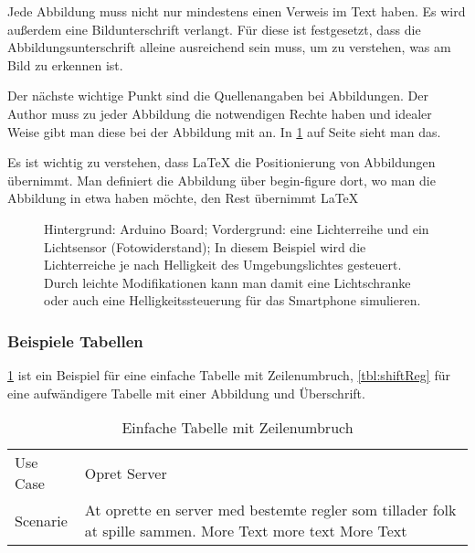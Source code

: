 Jede Abbildung muss nicht nur mindestens einen Verweis im Text haben. Es wird außerdem eine Bildunterschrift verlangt. Für diese ist festgesetzt, dass die Abbildungsunterschrift alleine ausreichend sein muss, um zu verstehen, was am Bild zu erkennen ist.

Der nächste wichtige Punkt sind die Quellenangaben bei Abbildungen. Der Author muss zu jeder Abbildung die notwendigen Rechte haben und idealer Weise gibt man diese bei der Abbildung mit an. In \cref{fig:ArduExample} auf Seite \pageref{fig:ArduExample} sieht man das.

Es ist wichtig zu verstehen, dass \LaTeX{} die Positionierung von Abbildungen übernimmt. Man definiert die Abbildung über begin-figure dort, wo man die Abbildung in etwa haben  möchte, den Rest übernimmt \LaTeX{}

\begin{figure}[t]
	\centering
	\caption[Arduino mit Lichtsensor und Lichterkette]{Hintergrund: Arduino Board;
		Vordergrund: eine Lichterreihe und ein Lichtsensor (Fotowiderstand); In diesem
		Beispiel wird die Lichterreiche je nach Helligkeit des Umgebungslichtes
		gesteuert. Durch leichte Modifikationen kann man damit eine Lichtschranke oder
		auch eine Helligkeitssteuerung für das Smartphone simulieren.}
	\label{fig:ArduExample}
\end{figure}

\subsubsection{Beispiele Tabellen}

\cref{tbl:lineBreak} ist ein Beispiel für eine einfache Tabelle mit
Zeilenumbruch, \cref{tbl:shiftReg} für eine aufwändigere Tabelle mit einer
Abbildung und Überschrift.

\begin{table}[h]
	\begin{tabularx}{\textwidth}{|l|X|}
		Use Case & Opret Server                                                                                               \\
		Scenarie & At oprette en server med bestemte regler som tillader folk at spille sammen. More Text more text More Text \\
	\end{tabularx}
	\caption{Einfache Tabelle mit Zeilenumbruch}
	\label{tbl:lineBreak}
\end{table}

